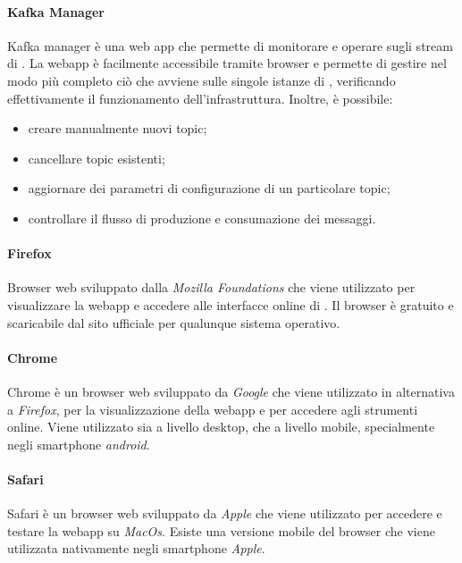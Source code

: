 				\paragraph{Kafka Manager}
					Kafka manager è una web app che permette di monitorare e operare sugli stream di . La webapp è facilmente accessibile tramite browser e permette di gestire nel modo più completo ciò che avviene sulle singole istanze di , verificando effettivamente il funzionamento dell'infrastruttura. Inoltre, è possibile:
					\begin{itemize}
					 	\item creare manualmente nuovi topic;
					 	\item cancellare topic esistenti;
					 	\item aggiornare dei parametri di configurazione di un particolare topic;
					 	\item controllare il flusso di produzione e consumazione dei messaggi.
					 \end{itemize} 

				\paragraph{Firefox} 
					Browser web sviluppato dalla \textit{Mozilla Foundations} che viene utilizzato per visualizzare la webapp e accedere alle interfacce online di . Il browser è gratuito e scaricabile dal sito ufficiale per qualunque sistema operativo.

				\paragraph{Chrome} 
					Chrome è un browser web sviluppato da \textit{Google} che viene utilizzato in alternativa a \textit{Firefox}, per la visualizzazione della webapp e per accedere agli strumenti online. Viene utilizzato sia a livello desktop, che a livello mobile, specialmente negli smartphone \textit{android}.

				\paragraph{Safari} 
					Safari è un browser web sviluppato da \textit{Apple} che viene utilizzato per accedere e testare la webapp su \textit{MacOs}. Esiste una versione mobile del browser che viene utilizzata nativamente negli smartphone \textit{Apple}.